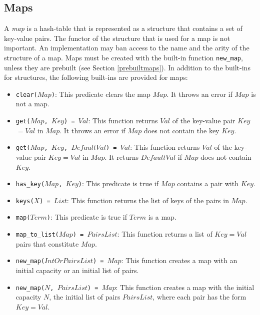 \subsection{Maps}
A \emph{map} is a hash-table that is represented as a structure that contains a set of key-value pairs. The functor of the structure that is used for a map is not important.  An implementation may ban access to the name and the arity of the structure of a map. Maps must be created with the built-in function \texttt{new\_map}, unless they are prebuilt (see Section \ref{prebuiltmaps}). In addition to the built-ins for structures, the following built-ins are provided for maps:
\begin{itemize}
\item \texttt{clear($Map$)}: This predicate clears the map $Map$. It throws an error if $Map$ is not a map.
\item \texttt{get($Map$, $Key$) = $Val$}: This function returns \texttt{$Val$} of the key-value pair \texttt{$Key$$=$$Val$} in \texttt{$Map$}. It throws an error if $Map$ does not contain the key $Key$.
\item \texttt{get($Map$, $Key$, $DefaultVal$) = $Val$}: This function returns \texttt{$Val$} of the key-value pair \texttt{$Key$$=$$Val$} in \texttt{$Map$}. It returns $DefaultVal$ if $Map$ does not contain $Key$.
\item \texttt{has\_key($Map$, $Key$)}: This predicate is true if $Map$ contains a pair with $Key$. 
\item \texttt{keys($X$) = $List$}: This function returns the list of keys of the pairs in $Map$.
\item \texttt{map($Term$)}: This predicate is true if $Term$ is a map. 
\item \texttt{map\_to\_list($Map$) = $PairsList$}: This function returns a list of \texttt{$Key$$=$$Val$} pairs that constitute $Map$. 
\item \texttt{new\_map($IntOrPairsList$) = $Map$}: This function creates a map with an initial capacity or an initial list of pairs.
\item \texttt{new\_map($N$, $PairsList$) = $Map$}: This function creates a map with the initial capacity $N$, the initial list of pairs $PairsList$, where each pair has the form \texttt{$Key$$=$$Val$}.

\end{itemize}

